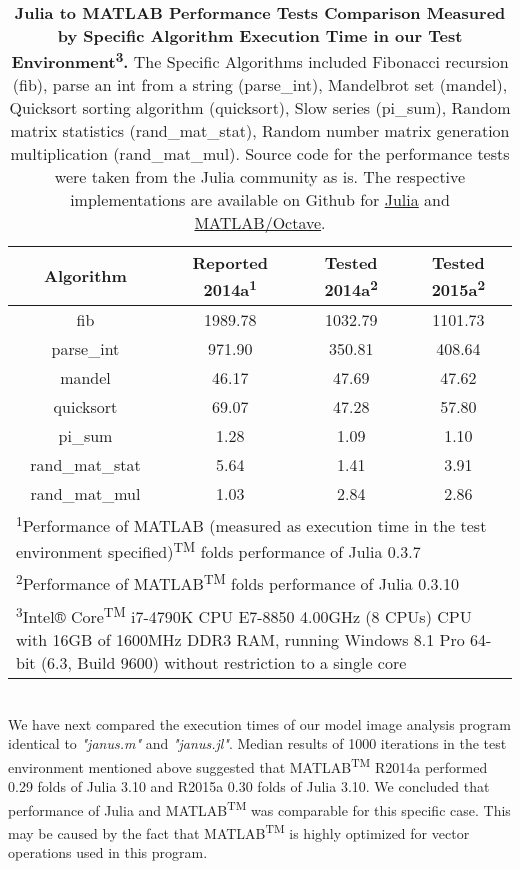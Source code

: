\begin{table} 
    \begin{tabular}{cccc}
    \hline
        \textbf{Algorithm} & \textbf{Reported 2014a\textsuperscript{1}} & \textbf{Tested  2014a\textsuperscript{2}} & \textbf{Tested 2015a\textsuperscript{2}}\\
        \hline
        fib & 1989.78 & 1032.79 & 1101.73 \\ 
        \hline
        parse\_int & 971.90 & 350.81 & 408.64 \\ 
        \hline
        mandel & 46.17 & 47.69 & 47.62 \\ 
        \hline
        quicksort & 69.07 & 47.28 & 57.80 \\ 
        \hline
        pi\_sum & 1.28 & 1.09 & 1.10 \\ 
        \hline
        rand\_mat\_stat & 5.64 & 1.41 & 3.91 \\ 
        \hline
        rand\_mat\_mul & 1.03 & 2.84 & 2.86 \\
        \hline
        \multicolumn{4}{l}{\textsuperscript{1}Performance of MATLAB (measured as execution time in the test environment specified)\textsuperscript{TM} folds performance of Julia 0.3.7} \\
        \multicolumn{4}{l}{\textsuperscript{2}Performance of MATLAB\textsuperscript{TM} folds performance of Julia 0.3.10} \\
        \multicolumn{4}{l}{\textsuperscript{3}Intel® Core\textsuperscript{TM} i7-4790K CPU E7-8850 4.00GHz (8 CPUs) CPU with 16GB of 1600MHz DDR3 RAM, running Windows 8.1 Pro 64-bit (6.3, Build 9600) without restriction to a single core} \\
    \end{tabular}
    \caption{\textbf{Julia to MATLAB Performance Tests Comparison Measured by Specific Algorithm Execution Time in our Test Environment\textsuperscript{3}.} The Specific Algorithms included Fibonacci recursion (fib), parse an int from a string (parse\_int), Mandelbrot set (mandel), Quicksort sorting algorithm (quicksort), Slow \pi  series (pi\_sum), Random matrix statistics (rand\_mat\_stat), Random number matrix generation multiplication (rand\_mat\_mul). Source code for the performance tests were taken from the Julia community as is. The respective implementations are available on Github for \href{https://github.com/JuliaLang/julia/blob/master/test/perf/micro/perf.jl}{Julia} and \href{https://github.com/JuliaLang/julia/blob/master/test/perf/micro/perf.m}{MATLAB/Octave}.}
\end{table}\\
  
We have next compared the execution times of our model image analysis program identical to \textit{"janus.m"} and \textit{"janus.jl"}. Median results of 1000 iterations in the test environment mentioned above suggested that MATLAB\textsuperscript{TM} R2014a performed 0.29 folds of Julia 3.10 and R2015a 0.30 folds of Julia 3.10. We concluded that performance of Julia and MATLAB\textsuperscript{TM} was comparable for this specific case. This may be caused by the fact that MATLAB\textsuperscript{TM} is highly optimized for vector operations used in this program.